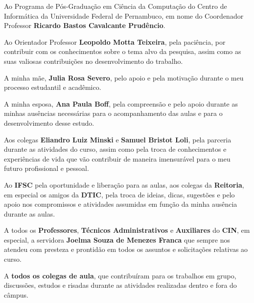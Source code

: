 \begin{agradecimentos}
Ao Programa de Pós-Graduação em Ciência da Computação do Centro de Informática da Universidade Federal de Pernambuco, em nome do Coordenador Professor \textbf{Ricardo Bastos Cavalcante Prudêncio}.

Ao Orientador Professor \textbf{Leopoldo Motta Teixeira}, pela paciência, por contribuir com os conhecimentos sobre o tema alvo da pesquisa, assim como as suas valiosas contribuições no desenvolvimento do trabalho.

A minha mãe, \textbf{Julia Rosa Severo}, pelo apoio e pela motivação durante o meu processo estudantil e acadêmico.

A minha esposa, \textbf{Ana Paula Boff}, pela compreensão e pelo apoio durante as minhas ausências necessárias para o acompanhamento das aulas e para o desenvolvimento desse estudo.

Aos colegas \textbf{Eliandro Luiz Minski} e \textbf{Samuel Bristot Loli}, pela parceria durante as atividades do curso, assim como pela troca de conhecimentos e experiências de vida que vão contribuir de maneira imensurável para o meu futuro profissional e pessoal.

Ao \textbf{IFSC} pela oportunidade e liberação para as aulas, aos colegas da \textbf{Reitoria}, em especial os amigos da \textbf{DTIC}, pela troca de ideias, dicas, sugestões e pelo apoio nos compromissos e atividades assumidas em função da minha ausência durante as aulas.

A todos os \textbf{Professores}, \textbf{Técnicos Administrativos} e \textbf{Auxiliares} do \textbf{CIN}, em especial, a servidora \textbf{Joelma Souza de Menezes Franca} que sempre nos atendeu com presteza e prontidão em todos os assuntos e solicitações relativas ao curso.

A \textbf{todos os colegas de aula}, que contribuíram para os trabalhos em grupo, discussões, estudos e risadas durante as atividades realizadas dentro e fora do câmpus. 




\end{agradecimentos}